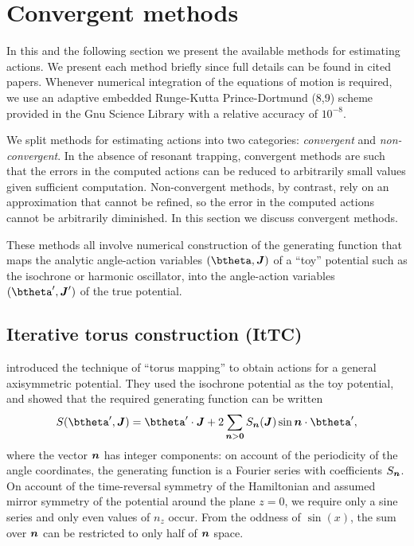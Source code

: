 \documentclass[useAMS,usenatbib,fleqn,a4paper]{mn2e}
\newcommand{\bs}[1]{\bmath{#1}}
\begin{document}
\section{Convergent methods}\label{Sect::MethodsC}

In this and the following section we present the available methods for
estimating actions.  We present each method briefly since full details can be
found in cited papers. Whenever numerical integration of the equations of
motion is required, we use an adaptive embedded Runge-Kutta Prince-Dortmund
(8,9) scheme provided in the Gnu Science Library \citep{GSL} with a relative
accuracy of $10^{-8}$.

We split methods for estimating actions into two categories:
\emph{convergent} and \emph{non-convergent}. In the absence of resonant
trapping, convergent methods are such that the errors in the computed actions
can be reduced to arbitrarily small values given sufficient computation.
Non-convergent methods, by contrast, rely on an approximation that cannot be
refined, so the error in the computed actions cannot be arbitrarily
diminished. In this section we discuss convergent methods.

These methods all involve numerical construction of the generating function that maps
the analytic angle-action variables $(\btheta,\boldsymbol{J})$ of a ``toy''
potential such as the isochrone or harmonic oscillator, into the angle-action
variables $(\btheta',\boldsymbol{J}')$ of the true potential.

\subsection{Iterative torus construction (ItTC)}\label{Method::ItTorus}

\cite{McGillBinney} introduced the technique of ``torus mapping'' to obtain
actions for a general axisymmetric potential. They used
the isochrone potential as the toy potential, and showed that the required
generating function can be written
\begin{equation}\label{eq:genGF}
S(\btheta',\bs{J}) = \btheta'\cdot\bs{J}
+2 \sum_{\bs{n}>\bs{0}}S_{\bs{n}}(\bs{J})\sin\bs{n}\cdot\btheta',
\end{equation}
where the vector $\bs{n}$ has integer components: on account of the
periodicity of the angle coordinates, the generating function is a Fourier
series with coefficients $S_{\bs{n}}$. On account of the time-reversal
symmetry of the Hamiltonian and assumed mirror symmetry of the potential
around the plane $z=0$, we require only a sine series and only even values of
$n_z$ occur. From the oddness of $\sin(x)$, the sum over $\bs{n}$ can be
restricted to only half of $\bs{n}$ space.
\end{document}
